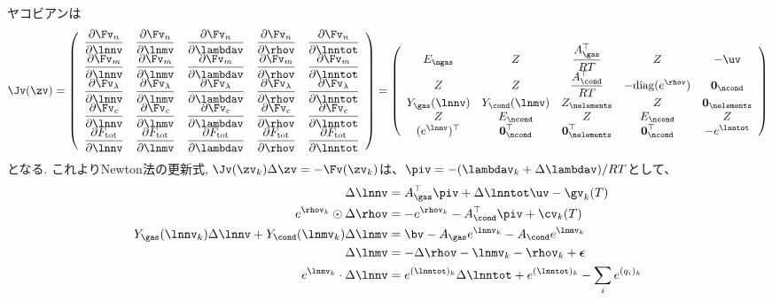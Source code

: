 ヤコビアンは
\begin{equation}
\label{eq:jacobian_tce_cond}
\Jv (\zv) =
\left(
\begin{array}{ccccc}
    \dfrac{\partial \Fv_n}{\partial \lnnv}  &  \dfrac{\partial \Fv_n}{\partial \lnmv} & \dfrac{\partial \Fv_n}{\partial \lambdav}&  \dfrac{\partial \Fv_n}{\partial \rhov} & \dfrac{\partial \Fv_n}{\partial \lnntot}\\ 
    \dfrac{\partial \Fv_m}{\partial \lnnv}  &  \dfrac{\partial \Fv_m}{\partial \lnmv} & \dfrac{\partial \Fv_m}{\partial \lambdav}&  \dfrac{\partial \Fv_m}{\partial \rhov} & \dfrac{\partial \Fv_m}{\partial \lnntot}\\
    \dfrac{\partial \Fv_\lambda}{\partial \lnnv}  &  \dfrac{\partial \Fv_\lambda}{\partial \lnmv} & \dfrac{\partial \Fv_\lambda}{\partial \lambdav}&  \dfrac{\partial \Fv_\lambda}{\partial \rhov} & \dfrac{\partial \Fv_\lambda}{\partial \lnntot}\\
    \dfrac{\partial \Fv_c}{\partial \lnnv}  &  \dfrac{\partial \Fv_c}{\partial \lnmv} & \dfrac{\partial \Fv_c}{\partial \lambdav}&  \dfrac{\partial \Fv_c}{\partial \rhov} & \dfrac{\partial \Fv_c}{\partial \lnntot}\\
    \dfrac{\partial F_\mathrm{tot}}{\partial \lnnv}  &  \dfrac{\partial F_\mathrm{tot}}{\partial \lnmv} & \dfrac{\partial F_\mathrm{tot}}{\partial \lambdav}&  \dfrac{\partial F_\mathrm{tot}}{\partial \rhov} & \dfrac{\partial F_\mathrm{tot}}{\partial \lnntot}\\
\end{array}
\right) =
\left(
\begin{array}{ccccc}
 E_\ngas & Z & \dfrac{A_\gas^\top}{RT} & Z & - \uv \\ 
 Z & Z & \dfrac{A_\cond^\top}{RT} & - \mathrm{diag} (e^{\rhov}) & \boldsymbol{0}_\ncond \\
 Y_\gas(\lnnv) & Y_\cond (\lnmv) & Z_\nelements & Z & \boldsymbol{0}_\nelements \\ 
 Z & E_\ncond & Z & E_\ncond & Z \\
 (e^{\lnnv})^\top & \boldsymbol{0}_\ncond^\top & \boldsymbol{0}_\nelements^\top & \boldsymbol{0}_\ncond^\top & - e^\lnntot\\  
\end{array}
\right)
\end{equation}
となる. これよりNewton法の更新式, $\Jv (\zv_k) \Delta \zv = - \Fv(\zv_k)$は、$\piv = - (\lambdav_k + \Delta \lambdav)/RT$として、
\begin{align}
\label{eq:kkt_y_1_d}
    \Delta \lnnv &= A_\gas^\top \piv + \Delta \lnntot \uv - \gv_k (T) \\
\label{eq:kkt_y_2_d}
      e^{\rhov_k} \odot \Delta \rhov &= - e^{\rhov_k} - A_\cond^\top \piv + \cv_k (T) \\
\label{eq:kkt_y_3_d}
    Y_\gas (\lnnv_k) \Delta \lnnv + Y_\cond (\lnmv_k) \Delta \lnmv &= \bv - A_\gas e^{\lnnv_k} - A_\cond e^{\lnmv_k} \\
\label{eq:kkt_y_4_d}
    \Delta \lnmv &= - \Delta \rhov - \lnmv_k - \rhov_k + \boldsymbol{\epsilon} \\
\label{eq:kkt_y_5_d}
    e^{\lnnv_k} \cdot \Delta \lnnv &= e^{(\lnntot)_k} \Delta \lnntot + e^{(\lnntot)_k} - \sum_i e^{(q_i)_k} 
\end{align}
